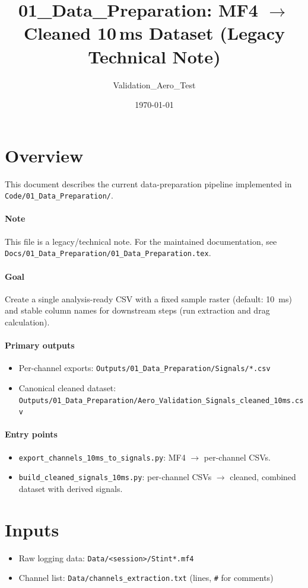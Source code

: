 \documentclass[11pt,a4paper]{article}
\title{01\_Data\_Preparation: MF4 \texorpdfstring{$\rightarrow$}{->} Cleaned 10\,ms Dataset (Legacy Technical Note)}
\author{Validation\_Aero\_Test}
\date{\today}
\begin{document}
\maketitle

\section{Overview}
This document describes the current data-preparation pipeline implemented in
  \texttt{Code/01\_Data\_Preparation/}.

\paragraph{Note}
This file is a legacy/technical note. For the maintained documentation, see
  \texttt{Docs/01\_Data\_Preparation/01\_Data\_Preparation.tex}.

\paragraph{Goal}
Create a single analysis-ready CSV with a fixed sample raster (default: \SI{10}{ms}) and stable column names for downstream steps (run extraction and drag calculation).

\paragraph{Primary outputs}
\begin{itemize}
  \item Per-channel exports: \texttt{Outputs/01\_Data\_Preparation/Signals/*.csv}
  \item Canonical cleaned dataset: \texttt{Outputs/01\_Data\_Preparation/Aero\_Validation\_Signals\_cleaned\_10ms.csv}
\end{itemize}

\paragraph{Entry points}
\begin{itemize}
  \item \texttt{export\_channels\_10ms\_to\_signals.py}: MF4 \texorpdfstring{$\rightarrow$}{->} per-channel CSVs.
  \item \texttt{build\_cleaned\_signals\_10ms.py}: per-channel CSVs \texorpdfstring{$\rightarrow$}{->} cleaned, combined dataset with derived signals.
\end{itemize}

\section{Inputs}
\begin{itemize}
  \item Raw logging data: \texttt{Data/<session>/Stint*.mf4}
  \item Channel list: \texttt{Data/channels\_extraction.txt} (lines, \texttt{\#} for comments)
\end{itemize}
\end{document}
